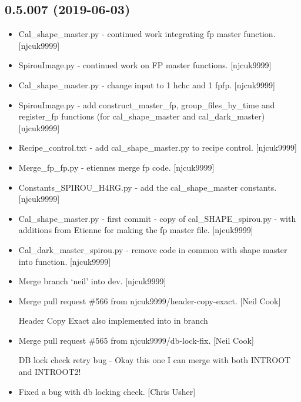 \documentclass[a4paper,10pt,english]{report}
\begin{document}
\subsection{0.5.007 (2019-06-03)}
\label{\detokenize{misc/changelog:id128}}\begin{itemize}
\item {} 
Cal\_shape\_master.py - continued work integrating fp master function.
{[}njcuk9999{]}

\item {} 
SpirouImage.py - continued work on FP master functions. {[}njcuk9999{]}

\item {} 
Cal\_shape\_master.py - change input to 1 hchc and 1 fpfp. {[}njcuk9999{]}

\item {} 
SpirouImage.py - add construct\_master\_fp, group\_files\_by\_time and
register\_fp functions (for cal\_shape\_master and cal\_dark\_master)
{[}njcuk9999{]}

\item {} 
Recipe\_control.txt - add cal\_shape\_master.py to recipe control.
{[}njcuk9999{]}

\item {} 
Merge\_fp\_fp.py - etiennes merge fp code. {[}njcuk9999{]}

\item {} 
Constants\_SPIROU\_H4RG.py - add the cal\_shape\_master constants.
{[}njcuk9999{]}

\item {} 
Cal\_shape\_master.py - first commit - copy of cal\_SHAPE\_spirou.py -
with additions from Etienne for making the fp master file. {[}njcuk9999{]}

\item {} 
Cal\_dark\_master\_spirou.py - remove code in common with shape master
into function. {[}njcuk9999{]}

\item {} 
Merge branch ‘neil’ into dev. {[}njcuk9999{]}

\item {} 
Merge pull request \#566 from njcuk9999/header-copy-exact. {[}Neil Cook{]}

Header Copy Exact \textendash{} also implemented into  in  branch

\item {} 
Merge pull request \#565 from njcuk9999/db-lock-fix. {[}Neil Cook{]}

DB lock check retry bug - Okay this one I can merge with both INTROOT and INTROOT2!

\item {} 
Fixed a bug with db locking check. {[}Chris Usher{]}

\end{itemize}
\end{document}
